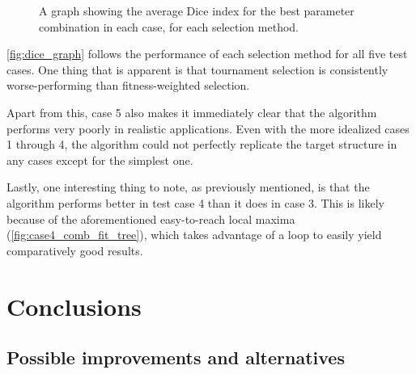 \documentclass{report}
\begin{document}
\begin{figure}[ht]
    \centering
    \caption{A graph showing the average Dice index for the best parameter combination in each case, for each selection method.}
    \label{fig:dice_graph}
\end{figure}

\autoref{fig:dice_graph} follows the performance of each selection method for all five test cases. One thing that is apparent is that tournament selection is consistently worse-performing than fitness-weighted selection.

Apart from this, case 5 also makes it immediately clear that the algorithm performs very poorly in realistic applications. Even with the more idealized cases 1 through 4, the algorithm could not perfectly replicate the target structure in any cases except for the simplest one.

Lastly, one interesting thing to note, as previously mentioned, is that the algorithm performs better in test case 4 than it does in case 3. This is likely because of the aforementioned easy-to-reach local maxima (\autoref{fig:case4_comb_fit_tree}), which takes advantage of a loop to easily yield comparatively good results.

\chapter{Conclusions}

\section{Possible improvements and alternatives}
\end{document}
